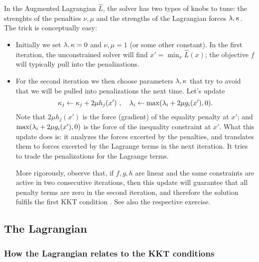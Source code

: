 In the Augmented Lagrangian $\hat L$, the solver has two types of
knobs to tune: the strenghts of the penalties $\nu,\mu$ and the
strengths of the Lagrangian forces $\lambda, \kappa$. The trick is conceptually
easy:
\begin{itemize}
\item Initially we set $\lambda, \kappa=0$ and $\nu,\mu = 1$ (or some other
constant). In the first iteration, the unconstrained solver will find $x'
 = \min_x \hat L(x)$; the objective $f$ will typically pull into the
 penalizations.
\item For the second iteration we then choose parameters $\lambda,\kappa$ that
 try to avoid that we will be pulled into penalizations the next
 time. Let's update
\begin{equation}
\kappa_j \gets \kappa_j + 2 \mu h_j(x')~,\quad \lambda_i \gets \max(\lambda_i + 2 \mu
g_i(x'), 0).
\end{equation}
Note that $2 \mu h_j(x')$ is the force (gradient) of
the equality penalty at $x'$; and $\max(\lambda_i + 2 \mu g_i(x'), 0)$ is
the force of the inequality constraint at $x'$. What this update
does is: it analyzes the forces excerted by the penalties, and
translates them to forces excerted by the Lagrange terms in the next
iteration. It tries to trade the penalizations for the Lagrange terms.

More rigorously, observe that, if $f,g,h$ are linear and the same
constraints are active in two consecutive iterations, then this update
will guarantee that all penalty terms are zero in the second
iteration, and therefore the solution fulfils the first KKT
condition \citep{14-toussaint-AugLag}. See also the respective exercise.
\end{itemize}

\subsection{The Lagrangian}

\subsubsection{How the Lagrangian relates to the KKT conditions}

